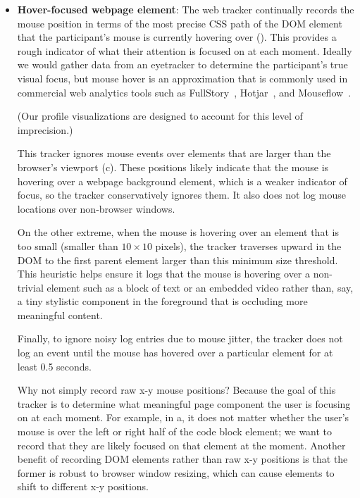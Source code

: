     \begin{itemize}

        \item \textbf{Hover-focused webpage element}: The web tracker
        continually records the mouse position in terms of the most
        precise CSS path of the DOM element that the participant's mouse is
        currently hovering over (). This provides a rough indicator of what
        their attention is focused on at each moment. Ideally we
        would gather data from an eyetracker to determine the
        participant's true visual focus, but mouse hover is an
        approximation that is commonly used in commercial web
        analytics tools such as FullStory~\cite{fullstory}, Hotjar~\cite{hotjar},
        and Mouseflow~\cite{mouseflow}.

        (Our profile visualizations are designed to account for this
        level of imprecision.)

        This tracker ignores mouse events over elements that are larger
        than the browser's viewport (c). These positions likely
        indicate that the mouse is hovering over a webpage
        background element, which is a weaker indicator of focus,
        so the tracker conservatively ignores them. It also does not log
        mouse locations over non-browser windows.

        On the other extreme, when the mouse is hovering over an element
        that is too small (smaller than $10\times10$ pixels), the
        tracker traverses upward in the DOM to the first parent element
        larger than this minimum size threshold. This heuristic helps
        ensure it logs that the mouse is hovering over a non-trivial
        element such as a block of text or an embedded video rather
        than, say, a tiny stylistic component in the foreground that is
        occluding more meaningful content.

        Finally, to ignore noisy log entries due to mouse jitter, the
        tracker does not log an event until the mouse has hovered over a
        particular element for at least 0.5 seconds.

        Why not simply record raw x-y mouse positions? Because the goal
        of this tracker is to determine what meaningful page component
        the user is focusing on at each moment. For example, in
        a, it does not matter whether the user's mouse
        is over the left or right half of the code block element;
        we want to record that they are likely focused on that element
        at the moment. Another benefit of recording DOM elements
        rather than raw x-y positions is that the former is robust to
        browser window resizing, which can cause elements to shift to
        different x-y positions.


\end{itemize}
